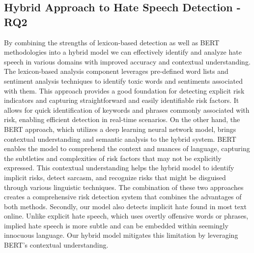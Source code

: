 \subsection{Hybrid Approach to Hate Speech Detection - RQ2}
By combining the strengths of lexicon-based detection as well as BERT methodologies into a hybrid model we can effectively identify and analyze hate speech in various domains with improved accuracy and contextual understanding. The lexicon-based analysis component leverages pre-defined word lists and sentiment analysis techniques to identify toxic words and sentiments associated with them.
This approach provides a good foundation for detecting explicit risk indicators and capturing straightforward and easily identifiable risk factors.
It allows for quick identification of keywords and phrases commonly associated with risk, enabling efficient detection in real-time scenarios.
On the other hand, the BERT approach, which utilizes a deep learning neural network model, brings contextual understanding and semantic analysis to the hybrid system. BERT enables the model to comprehend the context and nuances of language, capturing the subtleties and complexities of risk factors that may not be explicitly expressed.
This contextual understanding helps the hybrid model to identify implicit risks, detect sarcasm, and recognize risks that might be disguised through various linguistic techniques.
The combination of these two approaches creates a comprehensive risk detection system that combines the advantages of both methods. Secondly, our model also detects implicit hate found in most text online. Unlike explicit hate speech, which uses overtly offensive words or phrases, implied hate speech is more subtle and can be embedded within seemingly innocuous language. Our hybrid model mitigates this limitation by leveraging BERT's contextual understanding.

